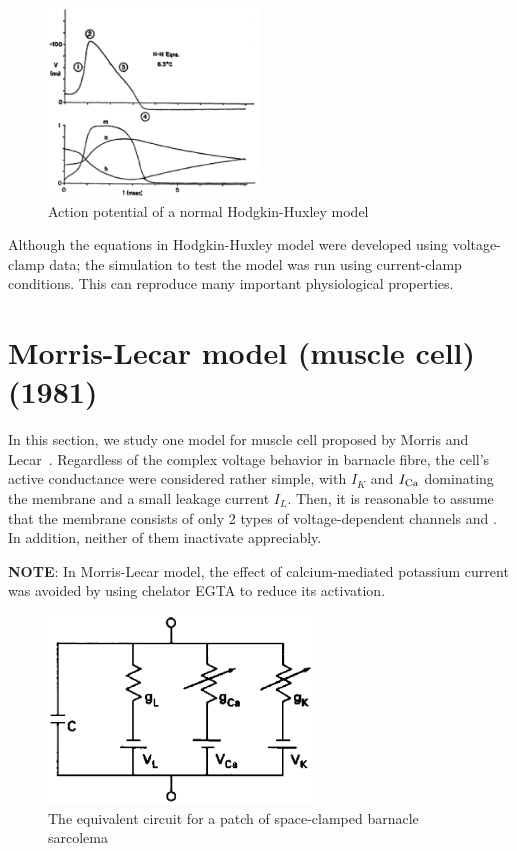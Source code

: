 \begin{figure}[hbt]
 \centerline{\includegraphics[height=5cm]{./images/FitzHugh1960_Vm.eps}}
\caption{Action potential of a normal Hodgkin-Huxley model}
\label{fig:FitzHugh1960_Vm}
\end{figure}

Although the equations in Hodgkin-Huxley model were developed using
voltage-clamp data; the simulation to test the model was run using current-clamp
conditions. This can reproduce many important physiological properties.


\section{Morris-Lecar model (muscle cell) (1981)}
\label{sec:morris-lecar-model}

In this section, we study one model for muscle cell proposed by Morris
and Lecar~\citep{morris1981vob}. Regardless of the complex voltage
behavior in barnacle fibre, the cell's active conductance were
considered rather simple, with $I_{K}$ and $I_{\ce{Ca}}$ dominating the
membrane and a small leakage current $I_L$. Then, it is reasonable to
assume that the membrane consists of only 2 types of voltage-dependent
channels  and . In addition, neither of them
inactivate appreciably.

{\bf NOTE}: In Morris-Lecar model, the effect of calcium-mediated
potassium current  was avoided by using 
chelator EGTA to reduce its activation.

\begin{figure}[htb]
  \centerline{\includegraphics[height=5cm]{./images/barnacle_fiber_circuit.eps}}
  \caption{The equivalent circuit for a patch of space-clamped
    barnacle sarcolema}\label{fig:barnacle_fiber}
\end{figure}

